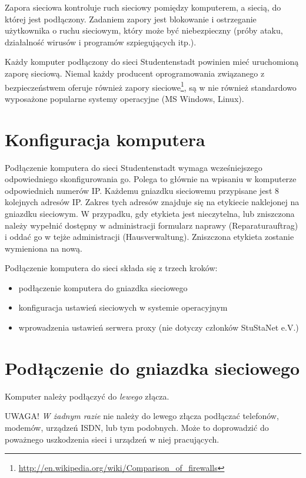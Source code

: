 \documentclass[a4paper,12pt]{scrartcl}
\begin{document}
Zapora sieciowa kontroluje ruch sieciowy pomiędzy komputerem, a siecią, do której jest podłączony. Zadaniem zapory jest blokowanie i ostrzeganie użytkownika o ruchu sieciowym, który może być niebezpieczny (próby ataku, działalność wirusów i programów szpiegujących itp.). 

Każdy komputer podłączony do sieci Studentenstadt powinien mieć uruchomioną zaporę sieciową. Niemal każdy producent oprogramowania związanego z bezpieczeństwem oferuje również zapory sieciowe\footnote{\url{http://en.wikipedia.org/wiki/Comparison_of_firewalls}}, są w nie również standardowo wyposażone popularne systemy operacyjne (MS Windows, Linux). 


\newpage

\section*{Konfiguracja komputera}

Podłączenie komputera do sieci Studentenstadt wymaga wcześniejszego
odpowiedniego skonfigurowania go. Polega to głównie na wpisaniu w komputerze odpowiednich numerów IP. Każdemu gniazdku sieciowemu przypisane jest 8 kolejnych adresów IP. Zakres tych adresów znajduje się na etykiecie naklejonej na gniazdku sieciowym. W przypadku, gdy etykieta jest nieczytelna, lub zniszczona należy wypełnić dostępny w administracji formularz naprawy (Reparaturauftrag) i oddać go w tejże administracji (Hausverwaltung). Zniszczona etykieta zostanie wymieniona na nową.

Podłączenie komputera do sieci składa się z trzech kroków:

\begin{itemize}
    \item podłączenie komputera do gniazdka sieciowego
    \item konfiguracja ustawień sieciowych w systemie operacyjnym
    \item wprowadzenia ustawień serwera proxy (nie dotyczy członków StuStaNet e.V.)
\end{itemize}

\section*{Podłączenie do gniazdka sieciowego}

Komputer należy podłączyć do \emph{lewego} złącza.

UWAGA! \emph{W żadnym razie} nie należy do lewego złącza podłączać telefonów, modemów, urządzeń ISDN, lub tym podobnych. Może to doprowadzić do poważnego uszkodzenia sieci i urządzeń w niej pracujących.
\end{document}
